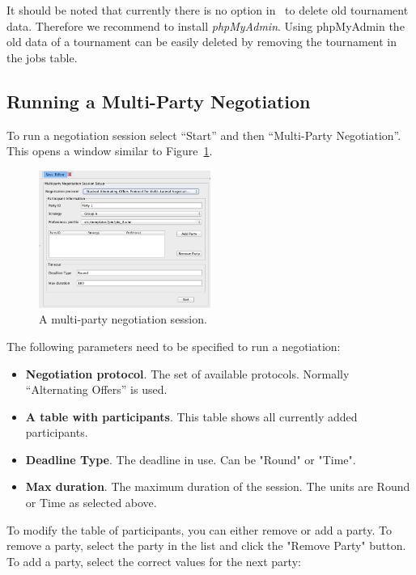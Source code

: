\documentclass[]{article}
\begin{document}
It should be noted that currently there is no option in \Genius~to delete old tournament data. Therefore we recommend to install \textit{phpMyAdmin}. Using phpMyAdmin the old data of a tournament can be easily deleted by removing the tournament in the jobs table.



\subsection{Running a Multi-Party Negotiation}
To run a negotiation session select ``Start'' and then ``Multi-Party Negotiation''. This opens a window similar to Figure~\ref{Fig:multipartysession}. 


\begin{figure}[h!]
	\centering
	\includegraphics[width=0.5\textwidth]{media/multipartysession.png}
\caption{A multi-party negotiation session.}\label{Fig:multipartysession}
\end{figure}


The following parameters need to be specified to run a negotiation:

\medskip
\begin{minipage}{.8 \textwidth}
\begin{itemize}
	\item \textbf{Negotiation protocol}. The set of available protocols. Normally ``Alternating Offers'' is used.
	\item \textbf{A table with participants}. This table shows all currently added participants. 
	\item \textbf{Deadline Type}. The deadline in use. Can be "Round" or "Time".
	\item \textbf{Max duration}. The maximum duration of the session. The units are Round or Time as selected above.
\end{itemize}
\end{minipage}
\medskip

To modify the table of participants, you can either remove or add a party. 
To remove a party, select the party in the list and click the "Remove Party" button. To add a party, select the correct values for the next party:
\end{document}
